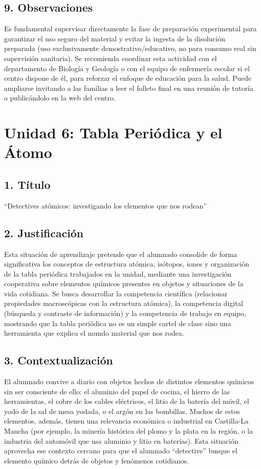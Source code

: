 \documentclass[11pt,a4paper]{article}
\begin{document}
\subsection*{9. Observaciones}
Es fundamental supervisar directamente la fase de preparación experimental para garantizar el uso seguro del material y evitar la ingesta de la disolución preparada (uso exclusivamente demostrativo/educativo, no para consumo real sin supervisión sanitaria). Se recomienda coordinar esta actividad con el departamento de Biología y Geología o con el equipo de enfermería escolar si el centro dispone de él, para reforzar el enfoque de educación para la salud. Puede ampliarse invitando a las familias a leer el folleto final en una reunión de tutoría o publicándolo en la web del centro.

\newpage
\section{Unidad 6: Tabla Periódica y el Átomo}
\subsection*{1. Título}
``Detectives atómicos: investigando los elementos que nos rodean''

\subsection*{2. Justificación}
Esta situación de aprendizaje pretende que el alumnado consolide de forma significativa los conceptos de estructura atómica, isótopos, iones y organización de la tabla periódica trabajados en la unidad, mediante una investigación cooperativa sobre elementos químicos presentes en objetos y situaciones de la vida cotidiana. Se busca desarrollar la competencia científica (relacionar propiedades macroscópicas con la estructura atómica), la competencia digital (búsqueda y contraste de información) y la competencia de trabajo en equipo, mostrando que la tabla periódica no es un simple cartel de clase sino una herramienta que explica el mundo material que nos rodea.

\subsection*{3. Contextualización}
El alumnado convive a diario con objetos hechos de distintos elementos químicos sin ser consciente de ello: el aluminio del papel de cocina, el hierro de las herramientas, el cobre de los cables eléctricos, el litio de la batería del móvil, el yodo de la sal de mesa yodada, o el argón en las bombillas. Muchos de estos elementos, además, tienen una relevancia económica o industrial en Castilla-La Mancha (por ejemplo, la minería histórica del plomo y la plata en la región, o la industria del automóvil que usa aluminio y litio en baterías). Esta situación aprovecha ese contexto cercano para que el alumnado ``detective'' busque el elemento químico detrás de objetos y fenómenos cotidianos.
\end{document}

